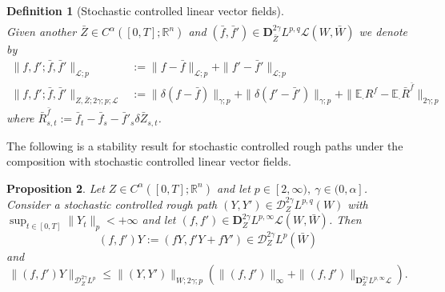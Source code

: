 \documentclass[11pt,a4paper]{article}
\newcommand{\R}{\mathbb{R}}
\newcommand{\E}{\mathbb{E}}
\newtheorem{defn}{Definition}[section]
\theoremstyle{plain}
\newtheorem{prop}[defn]{Proposition}
\begin{document}
\begin{defn}[Stochastic controlled linear vector fields]
\begin{align*}
\end{align*}
{ Given another $\bar Z \in C^\alpha([0,T];\R^n)$ and $(\bar f,\bar f') \in \mathbf{D}^{2\gamma}_{\bar Z}L^{p,q} \mathscr{L}(W,\bar W)$ we denote by \begin{align*}
    \| f, f' ; \bar f , \bar f' \|_{\mathscr{L};p} &:= \| f - \bar f\|_{\mathscr{L};p} + \| f' - \bar f'\|_{\mathscr{L};p} \\
    \| f, f' ; \bar f , \bar f' \|_{Z, \bar Z; 2\gamma;p;\mathscr{L}} &:= \| \delta (f - \bar f) \|_{\gamma;p} + \| \delta (f' - \bar f') \|_{\gamma;p} + \| \E_\cdot R^f - \E_\cdot \bar R^{\bar f} \|_{2\gamma;p}
\end{align*}
where $\bar R ^{\bar f}_{s,t} := \bar f_t - \bar f_s - \bar f'_s \delta \bar Z_{s,t}$.
}
\end{defn}

The following is a stability result for stochastic controlled rough paths under the composition with stochastic controlled linear vector fields.

\begin{prop} \label{prop:stabilityundercompositionlinearvectorfields2} 
Let $Z \in {C}^\alpha([0,T];\R^n)$ and let $p \in [2,\infty), \ \gamma \in (0,\alpha]$. 
Consider a stochastic controlled rough path $(Y,Y') \in \mathscr{D}_Z^{2\gamma}L^{p,q}(W)$ with $\sup_{t \in [0,T]} \|Y_t\|_p < +\infty$ and let $(f,f')\in  \mathbf{D}^{2\gamma}_ZL^{p,\infty}\mathscr{L}(W,\bar{W})$. Then \begin{equation*}
    (f,f')Y := (f Y,f' Y + f Y') \in \mathscr{D}_Z^{2\gamma}L^{p}(\bar{W})
\end{equation*} and \begin{equation*}
    \|(f,f')Y\|_{\mathscr{D}_Z^{2\gamma}L^p} \le \|(Y,Y')\|_{W;2\gamma;p} \left(\|(f,f')\|_\infty + \|(f,f')\|_{\mathbf{D}_Z^{2\gamma}L^{p,\infty} \mathscr{L}}\right).
\end{equation*}
\end{prop}
\end{document}
